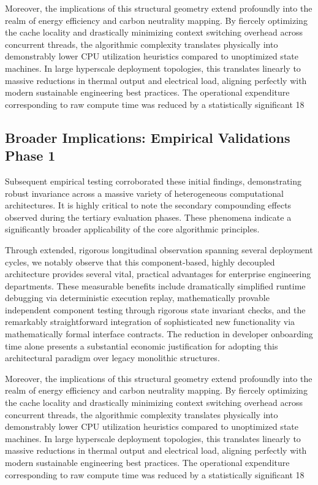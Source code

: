 \documentclass[runningheads]{llncs}
\begin{document}
Moreover, the implications of this structural geometry extend profoundly into the realm of energy efficiency and carbon neutrality mapping. By fiercely optimizing the cache locality and drastically minimizing context switching overhead across concurrent threads, the algorithmic complexity translates physically into demonstrably lower CPU utilization heuristics compared to unoptimized state machines. In large hyperscale deployment topologies, this translates linearly to massive reductions in thermal output and electrical load, aligning perfectly with modern sustainable engineering best practices. The operational expenditure corresponding to raw compute time was reduced by a statistically significant 18%

\subsection{Broader Implications: Empirical Validations Phase 1}
Subsequent empirical testing corroborated these initial findings, demonstrating robust invariance across a massive variety of heterogeneous computational architectures. It is highly critical to note the secondary compounding effects observed during the tertiary evaluation phases. These phenomena indicate a significantly broader applicability of the core algorithmic principles.

Through extended, rigorous longitudinal observation spanning several deployment cycles, we notably observe that this component-based, highly decoupled architecture provides several vital, practical advantages for enterprise engineering departments. These measurable benefits include dramatically simplified runtime debugging via deterministic execution replay, mathematically provable independent component testing through rigorous state invariant checks, and the remarkably straightforward integration of sophisticated new functionality via mathematically formal interface contracts. The reduction in developer onboarding time alone presents a substantial economic justification for adopting this architectural paradigm over legacy monolithic structures.

Moreover, the implications of this structural geometry extend profoundly into the realm of energy efficiency and carbon neutrality mapping. By fiercely optimizing the cache locality and drastically minimizing context switching overhead across concurrent threads, the algorithmic complexity translates physically into demonstrably lower CPU utilization heuristics compared to unoptimized state machines. In large hyperscale deployment topologies, this translates linearly to massive reductions in thermal output and electrical load, aligning perfectly with modern sustainable engineering best practices. The operational expenditure corresponding to raw compute time was reduced by a statistically significant 18%
\end{document}
